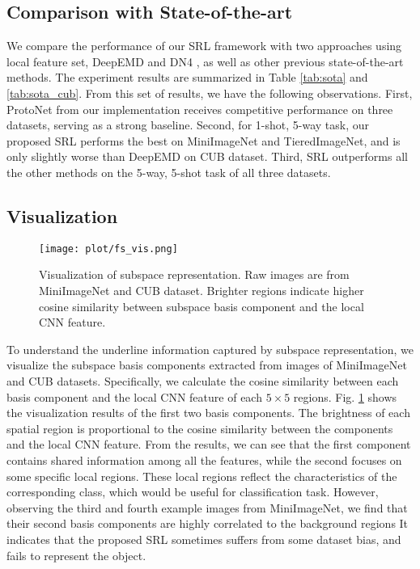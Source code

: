 \subsection{Comparison with State-of-the-art}
We compare the performance of our SRL framework with two approaches using local feature set, DeepEMD \cite{zhang2020deepemd} and DN4 \cite{li2019revisiting}, as well as other previous state-of-the-art methods.
The experiment results are summarized in Table \ref{tab:sota} and \ref{tab:sota_cub}.
From this set of results, we have the following observations.
First, ProtoNet from our implementation receives competitive performance on three datasets, serving as a strong baseline.
Second, for 1-shot, 5-way task, our proposed SRL performs the best on MiniImageNet and TieredImageNet, and is only slightly worse than DeepEMD on CUB dataset.
Third, SRL outperforms all the other methods on the 5-way, 5-shot task of all three datasets.

\subsection{Visualization}
\begin{figure}[t]
    \centering
    \texttt{[image: plot/fs\_vis.png]}
    \caption{Visualization of subspace representation. Raw images are from MiniImageNet and CUB dataset. Brighter regions indicate higher cosine similarity between subspace basis component and the local CNN feature.}
    \label{fig:vis}
\end{figure}

To understand the underline information captured by subspace representation, we visualize the subspace basis components extracted from images of MiniImageNet and CUB datasets.
Specifically, we calculate the cosine similarity between each basis component and the local CNN feature of each $5 \times 5$ regions.
Fig. \ref{fig:vis} shows the visualization results of the first two basis components. %
The brightness of each spatial region is proportional to the cosine similarity between the components and the local CNN feature.
From the results, we can see that the first component contains shared information among all the features, while the second focuses on some specific local regions.
These local regions reflect the characteristics of the corresponding class, which would be useful for classification task.
However, observing the third and fourth example images from MiniImageNet, we find that their second basis components are highly correlated to the background regions
It indicates that the proposed SRL sometimes suffers from some dataset bias, and fails to represent the object.



